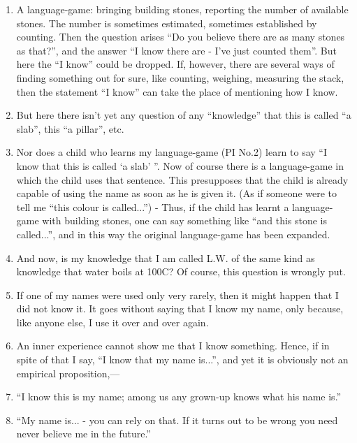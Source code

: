 \documentclass{book}
\begin{document}
\begin{enumerate}
\item
A language-game: bringing building stones, reporting the number of available
stones. The number is sometimes estimated, sometimes established by counting.
Then the question arises ``Do you believe there are as many stones as that?'',
and the answer ``I know there are - I've just counted them''. But here the ``I
know'' could be dropped. If, however, there are several ways of finding
something out for sure, like counting, weighing, measuring the stack, then the
statement ``I know'' can take the place of mentioning how I know.

\item
But here there isn't yet any question of any ``knowledge'' that this is called
``a slab'', this ``a pillar'', etc.

\item
Nor does a child who learns my language-game (PI No.2) learn to say ``I know
that this is called `a slab' ''.  Now of course there is a language-game in
which the child uses that sentence. This presupposes that the child is already
capable of using the name as soon as he is given it. (As if someone were to
tell me ``this colour is called...'') - Thus, if the child has learnt a
language-game with building stones, one can say something like ``and this stone
is called...'', and in this way the original language-game has been expanded.

\item
And now, is my knowledge that I am called L.W. of the same kind as knowledge
that water boils at 100C? Of course, this question is wrongly put.

\item
If one of my names were used only very rarely, then it might happen that I did
not know it. It goes without saying that I know my name, only because, like
anyone else, I use it over and over again.

\item
An inner experience cannot show me that I know something.  Hence, if in spite
of that I say, ``I know that my name is...'', and yet it is obviously not an
empirical proposition,---

\item
``I know this is my name; among us any grown-up knows what his name is.''

\item
``My name is... - you can rely on that. If it turns out to be wrong you need
never believe me in the future.''


\end{enumerate}
\end{document}
